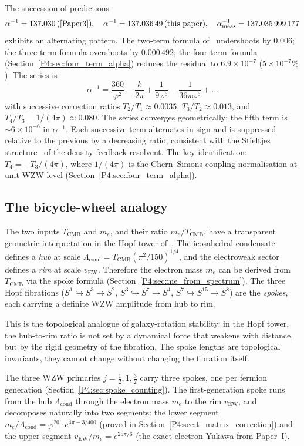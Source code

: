 \documentclass[11pt,a4paper]{article}
\theoremstyle{definition}
\theoremstyle{remark}
\newcommand{\vp}{\varphi}
\newcommand{\TCMB}{T_{\mathrm{CMB}}}
\newcommand{\vEW}{v_{\mathrm{EW}}}
\newcommand{\aInv}{\alpha^{-1}}
\newcommand{\Lcond}{\Lambda_{\mathrm{cond}}}
\begin{document}
The succession of predictions
\[
  \aInv = 137.030\,\text{(\cite{Paper3})},
  \quad
  \aInv = 137.036\,49\,\text{(this paper)},
  \quad
  \aInv_{\mathrm{meas}} = 137.035\,999\,177
\]
exhibits an alternating pattern.
The two-term formula of~\cite{Paper3} undershoots by $0.006$;
the three-term formula overshoots by $0.000\,492$;
the four-term formula (Section~\ref{P4:sec:four_term_alpha}) reduces
the residual to $6.9\times10^{-7}$ ($5\times10^{-7}\%$). The series is
\[
  \aInv = \frac{360}{\vp^2} - \frac{k}{2\pi}
         + \frac{1}{9\vp^6} - \frac{1}{36\pi\vp^6}
         + \ldots
\]
with successive correction ratios $T_2/T_1\approx0.0035$,
$T_3/T_2\approx0.013$, and $T_4/T_3 = 1/(4\pi)\approx0.080$.
The series converges geometrically; the fifth term is
$\sim6\times10^{-6}$ in $\aInv$.
Each successive term alternates in sign and is suppressed relative
to the previous by a decreasing ratio, consistent with the Stieltjes
structure~\cite{Hardy1949} of the density-feedback resolvent.
The key identification: $T_4 = -T_3/(4\pi)$, where $1/(4\pi)$ is the
Chern--Simons coupling normalisation at unit WZW level
(Section~\ref{P4:sec:four_term_alpha}).

\subsection{The bicycle-wheel analogy}

The two inputs $\TCMB$ and $m_e$, and their ratio $m_e/\TCMB$, have a transparent geometric interpretation in the Hopf tower of~\cite{Paper1}.  The icosahedral condensate defines a \emph{hub} at scale $\Lcond = \TCMB(\pi^2/150)^{1/4}$, and the electroweak sector defines a \emph{rim} at scale $\vEW$.  Therefore the electron mass $m_e$ can be derived from $\TCMB$ via the spoke formula (Section~\ref{P4:sec:me_from_spectrum}).
The three Hopf fibrations ($S^1\hookrightarrow S^3\to S^2$,
$S^3\hookrightarrow S^7\to S^4$, $S^7\hookrightarrow S^{15}\to S^8$)
are the \emph{spokes}, each carrying a definite WZW amplitude from hub to rim.

This is the topological analogue of galaxy-rotation stability: in the
Hopf tower, the hub-to-rim ratio is not set by a dynamical force that
weakens with distance, but by the rigid geometry of the fibration.  The
spoke lengths are topological invariants, they cannot change without
changing the fibration itself.

The three WZW primaries $j=\tfrac{1}{2},1,\tfrac{3}{2}$ carry three spokes,
one per fermion generation (Section~\ref{P4:sec:spoke_counting}).
The first-generation spoke runs from the hub $\Lcond$ through the electron
mass $m_e$ to the rim $\vEW$, and decomposes naturally into two segments:
the lower segment $m_e/\Lcond = \vp^{20}\cdot e^{4\pi-3/400}$ (proved in
Section~\ref{P4:sec:t_matrix_correction}) and the upper segment $\vEW/m_e = e^{25\pi/6}$
(the exact electron Yukawa from Paper~I).
\end{document}
